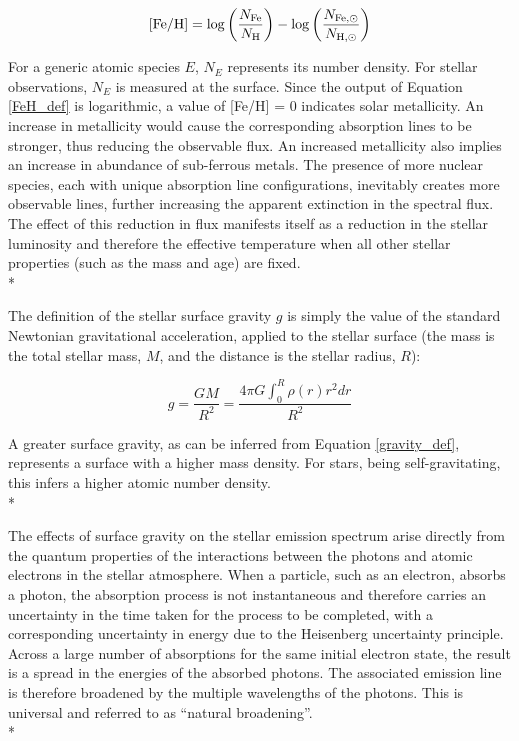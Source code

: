 \documentclass[12pt, a4paper]{report}
\begin{document}
\begin{equation}
\textnormal{[Fe/H]} = \log\left(\frac{N_{\textnormal{Fe}}}{N_{\textnormal{H}}}\right) - \log\left(\frac{N_{\textnormal{Fe},\odot}}{N_{\textnormal{H},\odot}}\right)
\label{FeH_def}
\end{equation}

For a generic atomic species $E$, $N_{E}$ represents its number density. For stellar observations, $N_{E}$ is measured at the surface. Since the output of Equation \ref{FeH_def} is logarithmic, a value of [Fe/H] = 0 indicates solar metallicity. An increase in metallicity would cause the corresponding absorption lines to be stronger, thus reducing the observable flux. An increased metallicity also implies an increase in abundance of sub-ferrous metals. The presence of more nuclear species, each with unique absorption line configurations, inevitably creates more observable lines, further increasing the apparent extinction in the spectral flux. The effect of this reduction in flux manifests itself as a reduction in the stellar luminosity and therefore the effective temperature when all other stellar properties (such as the mass and age) are fixed.\\*

The definition of the stellar surface gravity $g$ is simply the value of the standard Newtonian gravitational acceleration, applied to the stellar surface (the mass is the total stellar mass, $M$, and the distance is the stellar radius, $R$):

\begin{equation}
g = \frac{GM}{R^{2}} = \frac{4\pi G\int_{0}^{R}\rho(r)r^{2}dr}{R^{2}}
\label{gravity_def}
\end{equation}

A greater surface gravity, as can be inferred from Equation \ref{gravity_def}, represents a surface with a higher mass density. For stars, being self-gravitating, this infers a higher atomic number density.  \\*


The effects of surface gravity on the stellar emission spectrum arise directly from the quantum properties of the interactions between the photons and atomic electrons in the stellar atmosphere. When a particle, such as an electron, absorbs a photon, the absorption process is not instantaneous and therefore carries an uncertainty in the time taken for the process to be completed, with a corresponding uncertainty in energy due to the Heisenberg uncertainty principle. Across a large number of absorptions for the same initial electron state, the result is a spread in the energies of the absorbed photons. The associated emission line is therefore broadened by the multiple wavelengths of the photons. This is universal and referred to as ``natural broadening''.\\*
\end{document}
